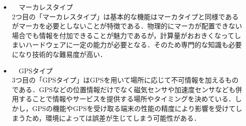 \begin{itemize}
\item　マーカレスタイプ \\



2つ目の「マーカレスタイプ」は基本的な機能はマーカタイプと同様であるがマーカを必要としないことが特徴である．物理的にマーカが配置できない場合でも情報を付加できることが魅力であるが，計算量がおおきくなってしまいハードウェアに一定の能力が必要となる．そのため専門的な知識も必要になり技術的な難易度が高い．　


\end{itemize}


\begin{itemize}
\item　GPSタイプ \\


3つ目の「GPSタイプ」はGPSを用いて場所に応じて不可情報を加えるものである．GPSなどの位置情報だけでなく磁気センサや加速度センサなども併用することで情報やサービスを提供する場所やタイミングを決めている．しかし，GPSの機能やGPSを受け取る端末の性能の精度により影響を受けてしまうため，環境によっては誤差が生じてしまう可能性がある．



\end{itemize}














